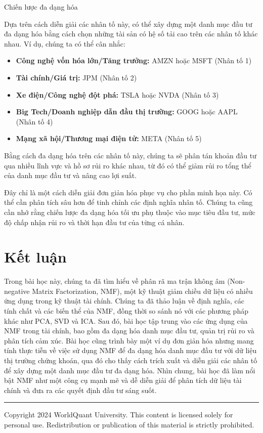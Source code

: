 Chiến lược đa dạng hóa

Dựa trên cách diễn giải các nhân tố này, có thể xây dựng một danh mục đầu tư đa dạng hóa bằng cách chọn những tài sản có hệ số tải cao trên các nhân tố khác nhau. Ví dụ, chúng ta có thể cân nhắc:

\begin{itemize}
\item
  \textbf{Công nghệ vốn hóa lớn/Tăng trưởng:} AMZN hoặc MSFT (Nhân tố 1)
\item
  \textbf{Tài chính/Giá trị:} JPM (Nhân tố 2)
\item
  \textbf{Xe điện/Công nghệ đột phá:} TSLA hoặc NVDA (Nhân tố 3)
\item
  \textbf{Big Tech/Doanh nghiệp dẫn đầu thị trường:} GOOG hoặc AAPL (Nhân tố 4)
\item
  \textbf{Mạng xã hội/Thương mại điện tử:} META (Nhân tố 5)
\end{itemize}

Bằng cách đa dạng hóa trên các nhân tố này, chúng ta sẽ phân tán khoản đầu tư qua nhiều lĩnh vực và hồ sơ rủi ro khác nhau, từ đó có thể giảm rủi ro tổng thể của danh mục đầu tư và nâng cao lợi suất.

Đây chỉ là một cách diễn giải đơn giản hóa phục vụ cho phần minh họa này. Có thể cần phân tích sâu hơn để tinh chỉnh các định nghĩa nhân tố. Chúng ta cũng cần nhớ rằng chiến lược đa dạng hóa tối ưu phụ thuộc vào mục tiêu đầu tư, mức độ chấp nhận rủi ro và thời hạn đầu tư của từng cá nhân.

\section{Kết luận}

Trong bài học này, chúng ta đã tìm hiểu về phân rã ma trận không âm (Non-negative Matrix Factorization, NMF), một kỹ thuật giảm chiều dữ liệu có nhiều ứng dụng trong kỹ thuật tài chính. Chúng ta đã thảo luận về định nghĩa, các tính chất và các biến thể của NMF, đồng thời so sánh nó với các phương pháp khác như PCA, SVD và ICA. Sau đó, bài học tập trung vào các ứng dụng của NMF trong tài chính, bao gồm đa dạng hóa danh mục đầu tư, quản trị rủi ro và phân tích cảm xúc. Bài học cũng trình bày một ví dụ đơn giản hóa nhưng mang tính thực tiễn về việc sử dụng NMF để đa dạng hóa danh mục đầu tư với dữ liệu thị trường chứng khoán, qua đó cho thấy cách trích xuất và diễn giải các nhân tố để xây dựng một danh mục đầu tư đa dạng hóa. Nhìn chung, bài học đã làm nổi bật NMF như một công cụ mạnh mẽ và dễ diễn giải để phân tích dữ liệu tài chính và đưa ra các quyết định đầu tư sáng suốt.

\begin{center}\rule{0.5\linewidth}{0.5pt}\end{center}

Copyright 2024 WorldQuant University. This content is licensed solely for personal use. Redistribution or publication of this material is strictly prohibited.
